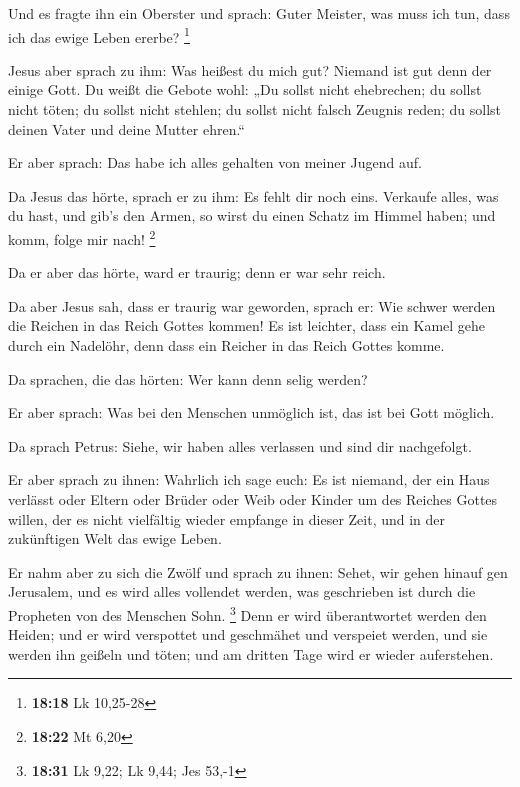  Und es fragte ihn ein Oberster und sprach: Guter
Meister, was muss ich tun, dass ich das ewige Leben ererbe? \footnote{\textbf{18:18}
  Lk 10,25-28}

 Jesus aber sprach zu ihm: Was heißest du mich gut?
Niemand ist gut denn der einige Gott.  Du weißt die
Gebote wohl: „Du sollst nicht ehebrechen; du sollst nicht töten; du
sollst nicht stehlen; du sollst nicht falsch Zeugnis reden; du sollst
deinen Vater und deine Mutter ehren.``

 Er aber sprach: Das habe ich alles gehalten von meiner
Jugend auf.

 Da Jesus das hörte, sprach er zu ihm: Es fehlt dir noch
eins. Verkaufe alles, was du hast, und gib's den Armen, so wirst du
einen Schatz im Himmel haben; und komm, folge mir nach! \footnote{\textbf{18:22}
  Mt 6,20}

 Da er aber das hörte, ward er traurig; denn er war sehr
reich.

 Da aber Jesus sah, dass er traurig war geworden, sprach
er: Wie schwer werden die Reichen in das Reich Gottes kommen!
 Es ist leichter, dass ein Kamel gehe durch ein Nadelöhr,
denn dass ein Reicher in das Reich Gottes komme.

 Da sprachen, die das hörten: Wer kann denn selig werden?

 Er aber sprach: Was bei den Menschen unmöglich ist, das
ist bei Gott möglich.

 Da sprach Petrus: Siehe, wir haben alles verlassen und
sind dir nachgefolgt.

 Er aber sprach zu ihnen: Wahrlich ich sage euch: Es ist
niemand, der ein Haus verlässt oder Eltern oder Brüder oder Weib oder
Kinder um des Reiches Gottes willen,  der es nicht
vielfältig wieder empfange in dieser Zeit, und in der zukünftigen Welt
das ewige Leben.

 Er nahm aber zu sich die Zwölf und sprach zu ihnen:
Sehet, wir gehen hinauf gen Jerusalem, und es wird alles vollendet
werden, was geschrieben ist durch die Propheten von des Menschen Sohn.
\footnote{\textbf{18:31} Lk 9,22; Lk 9,44; Jes 53,-1} 
Denn er wird überantwortet werden den Heiden; und er wird verspottet und
geschmähet und verspeiet werden,  und sie werden ihn
geißeln und töten; und am dritten Tage wird er wieder auferstehen.


